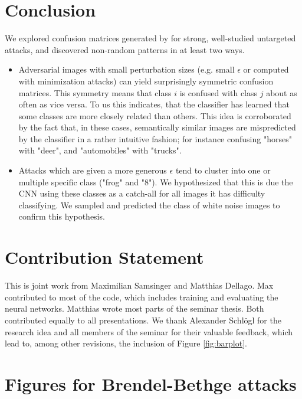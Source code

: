\documentclass{article}
\begin{document}
\section{Conclusion}
We explored confusion matrices generated by for strong, well-studied untargeted attacks, and discovered non-random patterns in at least two ways.
\begin{itemize}
	\item Adversarial images with small perturbation sizes (e.g. small $\epsilon$ or computed with minimization attacks) can yield surprisingly symmetric confusion matrices. This symmetry means that class $i$ is confused with class $j$ about as often as vice versa. To us this indicates, that the classifier has learned that some classes are more closely related than others.
	This idea is corroborated by the fact that, in these cases, semantically similar images are mispredicted by the classifier in a rather intuitive fashion; for instance confusing "horses" with "deer", and "automobiles" with "trucks".

	\item Attacks which are given a more generous $\epsilon$ tend to cluster into one or multiple specific class ("frog" and "8"). We hypothesized that this is due the CNN using these classes as a catch-all for all images it has difficulty classifying. We sampled and predicted the class of white noise images to confirm this hypothesis.
\end{itemize}

\section{Contribution Statement}

This is joint work from Maximilian Samsinger and Matthias Dellago. Max contributed to most of the code, which includes training and evaluating the neural networks. Matthias wrote most parts of the seminar thesis. Both contributed equally to all presentations.
We thank Alexander Schlögl for the research idea and all members of the seminar for their valuable feedback, which lead to, among other revisions, the inclusion of Figure \ref{fig:barplot}.



\appendix
\newpage
\section{Figures for Brendel-Bethge attacks}\label{sec:BB}
\end{document}
